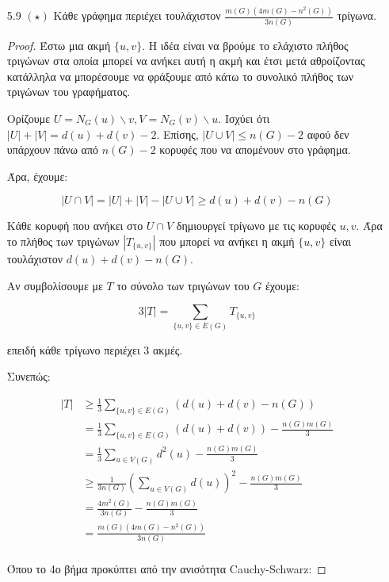 \documentclass[a4paper, oneside, 11pt]{article}
\theoremstyle{definition}
\begin{document}
\begin{enumerate}
   \item[5.9 $(\star)$]
      Κάθε γράφημα περιέχει τουλάχιστον $\frac{m(G)(4m(G) - n^2(G))}{3n(G)}$
      τρίγωνα.

      \begin{proof}

      Έστω μια ακμή $\{u, v\}$. Η ιδέα είναι να βρούμε το ελάχιστο πλήθος
      τριγώνων στα οποία μπορεί να ανήκει αυτή η ακμή και έτσι μετά αθροίζοντας
      κατάλληλα να μπορέσουμε να φράξουμε από κάτω το συνολικό πλήθος των
      τριγώνων του γραφήματος.

      Ορίζουμε $U = N_G(u) \backslash v,
      V = N_G(v) \backslash u$. Ισχύει ότι $|U| + |V| = d(u) + d(v) - 2$.
      Επίσης, $|U \cup V| \leq n(G) - 2$ αφού δεν υπάρχουν πάνω από
      $n(G)-2$ κορυφές που να απομένουν στο γράφημα.

      Άρα, έχουμε:

      \[ |U \cap V| = |U| + |V| - |U \cup V| \geq d(u) + d(v) - n(G) \]

      Κάθε κορυφή που ανήκει στο $U \cap V$ δημιουργεί τρίγωνο με τις
      κορυφές $u, v$. Άρα το πλήθος των τριγώνων $|T_{\{u, v\}}|$ που μπορεί
      να ανήκει
      η ακμή $\{u, v\}$ είναι τουλάχιστον $d(u) + d(v) - n(G)$.

      Αν συμβολίσουμε με $T$ το σύνολο των τριγώνων του $G$ έχουμε:

      \[ 3|T| = \sum_{\{u, v\} \in E(G)} T_{\{u, v\}} \]

      επειδή κάθε τρίγωνο περιέχει 3 ακμές.

      Συνεπώς:

      \begin{align*}
         |T| &\geq \frac13 \sum_{\{u, v\} \in E(G)} ( d(u) + d(v) - n(G) )\\
             &= \frac13 \sum_{\{u, v\} \in E(G)} ( d(u) + d(v) ) -
                \frac{n(G)m(G)}3 \\
             &= \frac13 \sum_{u \in V(G)} d^2(u) - \frac{n(G)m(G)}3\\
             &\geq \frac1{3n(G)} \left( \sum_{u \in V(G)} d(u) \right)^2
                 - \frac{n(G)m(G)}3\\
             &= \frac{4m^2(G)}{3n(G)} - \frac{n(G)m(G)}3\\
             &= \frac{m(G)(4m(G) - n^2(G))}{3n(G)}\\
      \end{align*}

      Όπου το 4ο βήμα προκύπτει από την ανισότητα Cauchy-Schwarz:


\end{proof}
\end{enumerate}
\end{document}
